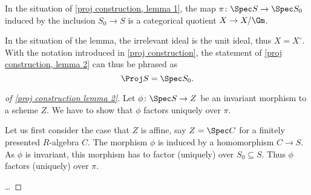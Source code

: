 \begin{lemma}\label{proj construction lemma 2}
  In the situation of \cref{proj construction, lemma 1}, the map
  $\pi\colon \Spec S \to \Spec S_0$ induced by the inclusion $S_0 \to
  S$ is a categorical quotient $X \to X/\Gm$.
\end{lemma}

\begin{remark}
  In the situation of the lemma, the irrelevant ideal is the unit
  ideal, thus $X = X^\circ$.  With the notation introduced in
  \cref{proj construction}, the statement of \cref{proj construction,
    lemma 2} can thus be phrased as
  \begin{equation*}
    \Proj S = \Spec S_0.
  \end{equation*}
\end{remark}

\begin{proof}[of \cref{proj construction lemma 2}]
  Let $\phi\colon \Spec S \to Z$ be an invariant morphism to a scheme $Z$.
  We have to show that $\phi$ factors uniquely over $\pi$.

  Let us first consider the case that $Z$ is affine, say $Z = \Spec C$
  for a finitely presented $R$-algebra $C$.  The morphism $\phi$ is
  induced by a homomorphism $C \to S$.  As $\phi$ is invariant, this
  morphism has to factor (uniquely) over $S_0 \subseteq S$.  Thus
  $\phi$ factors (uniquely) over $\pi$.

  \dots
\end{proof}


